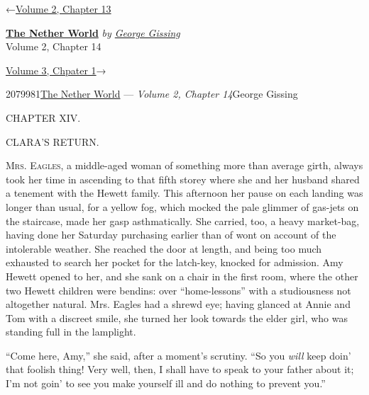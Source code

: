 \hypertarget{headerContainer}{}
\hypertarget{navigationHeader}{}
\protect\hypertarget{headerprevious}{}{←\href{/wiki/The_Nether_World/Volume_2/Chapter_13}{Volume
2, Chapter 13}}

\textbf{\protect\hypertarget{header_title_text}{}{\href{/wiki/The_Nether_World}{The
Nether World}}} \emph{by
\href{/wiki/Author:George_Gissing}{\protect\hypertarget{header_author_text}{}{{George
Gissing}}}}\\
\protect\hypertarget{header_section_text}{}{Volume 2, Chapter 14}

\protect\hypertarget{headernext}{}{\href{/wiki/The_Nether_World/Volume_3/Chapter_1}{Volume
3, Chpater 1}→}

\hypertarget{navigationNotes}{}

\hypertarget{ws-data}{}
\protect\hypertarget{ws-article-id}{}{2079981}\protect\hypertarget{ws-title}{}{\href{/wiki/The_Nether_World}{The
Nether World} --- \emph{Volume 2, Chapter
14}}\protect\hypertarget{ws-author}{}{George Gissing}

{\protect\hypertarget{290}{}{}}

{CHAPTER XIV.}

CLARA'S RETURN.

\textsc{Mrs. Eagles}, a middle-aged woman of something more than average
girth, always took her time in ascending to that fifth storey where she
and her husband shared a tenement with the Hewett family. This afternoon
her pause on each landing was longer than usual, for a yellow fog, which
mocked the pale glimmer of gas-jets on the staircase, made her gasp
asthmatically. She carried, too, a heavy market-bag, having done her
Saturday purchasing earlier than of wont on account of the intolerable
weather. She reached the door at length, and being too much exhausted to
search her pocket for the latch-key, knocked for admission. Amy Hewett
opened to her, and she sank on a chair in the first room, where the
other two Hewett children were bendins: over ``home-lessons'' with a
{\protect\hypertarget{291}{}{}}studiousness not altogether natural. Mrs.
Eagles had a shrewd eye; having glanced at Annie and Tom with a discreet
smile, she turned her look towards the elder girl, who was standing full
in the lamplight.

``Come here, Amy,'' she said, after a moment's scrutiny. ``So you
\emph{will} keep doin' that foolish thing! Very well, then, I shall have
to speak to your father about it; I'm not goin' to see you make yourself
ill and do nothing to prevent you.''

